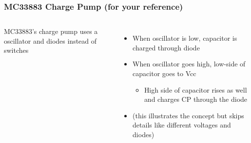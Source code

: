 \documentclass{beamer}
\begin{document}
\begin{frame}
\frametitle{MC33883 Charge Pump \small (for your reference)}
\begin{columns}[t]
MC33883's charge pump uses a oscillator and diodes instead of switches
\begin{itemize}
  \item When oscillator is low, capacitor is charged through diode
  \item <2-> When oscillator goes high, low-side of capacitor goes to Vcc
  \begin{itemize}
    \item <2-> High side of capacitor rises as well and charges CP through the diode
  \end{itemize}
  \item <2-> (this illustrates the concept but skips details like different voltages and diodes)
\end{itemize}


\end{columns}
\end{frame}
\end{document}
